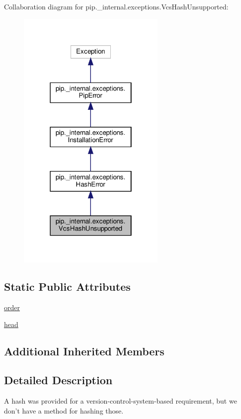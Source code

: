 Collaboration diagram for pip.\+\_\+internal.\+exceptions.\+Vcs\+Hash\+Unsupported\+:
\nopagebreak
\begin{figure}[H]
\begin{center}
\leavevmode
\includegraphics[width=202pt]{classpip_1_1__internal_1_1exceptions_1_1VcsHashUnsupported__coll__graph}
\end{center}
\end{figure}
\subsection*{Static Public Attributes}
\begin{DoxyCompactItemize}
\item 
\hyperlink{classpip_1_1__internal_1_1exceptions_1_1VcsHashUnsupported_a69fb725da010183c79b173ed638ef376}{order}
\item 
\hyperlink{classpip_1_1__internal_1_1exceptions_1_1VcsHashUnsupported_a0aa31613db66e174c8ec1a68dcb80f08}{head}
\end{DoxyCompactItemize}
\subsection*{Additional Inherited Members}


\subsection{Detailed Description}
\begin{DoxyVerb}A hash was provided for a version-control-system-based requirement, but
we don't have a method for hashing those.\end{DoxyVerb}
 

